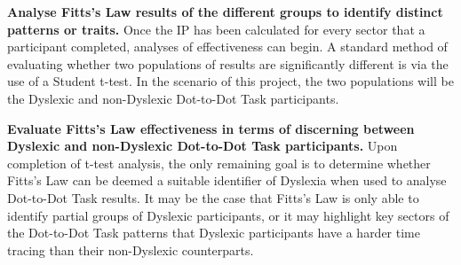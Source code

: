 			\textbf{Analyse Fitts’s Law results of the different groups to identify distinct patterns or traits.}
			Once the IP has been calculated for every sector that a participant completed, analyses of effectiveness can begin. A standard method of evaluating whether two populations of results are significantly different is via the use of a Student t-test. In the scenario of this project, the two populations will be the Dyslexic and non-Dyslexic Dot-to-Dot Task participants.
			
			\textbf{Evaluate Fitts’s Law effectiveness in terms of discerning between Dyslexic and non-Dyslexic Dot-to-Dot Task participants.}
			Upon completion of t-test analysis, the only remaining goal is to determine whether Fitts’s Law can be deemed a suitable identifier of Dyslexia when used to analyse Dot-to-Dot Task results. It may be the case that Fitts’s Law is only able to identify partial groups of Dyslexic participants, or it may highlight key sectors of the Dot-to-Dot Task patterns that Dyslexic participants have a harder time tracing than their non-Dyslexic counterparts.
			
\newpage